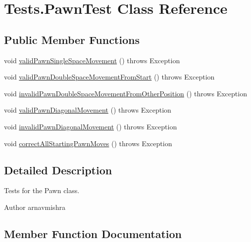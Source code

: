 \hypertarget{class_tests_1_1_pawn_test}{}\section{Tests.\+Pawn\+Test Class Reference}
\label{class_tests_1_1_pawn_test}
\subsection*{Public Member Functions}
\begin{DoxyCompactItemize}
\item 
void \hyperlink{class_tests_1_1_pawn_test_afc62c7df60ea48714139aa3b1fdec002}{valid\+Pawn\+Single\+Space\+Movement} ()  throws Exception 
\item 
void \hyperlink{class_tests_1_1_pawn_test_a609983048db9ea8be85c1a0eca1a4c64}{valid\+Pawn\+Double\+Space\+Movement\+From\+Start} ()  throws Exception 
\item 
void \hyperlink{class_tests_1_1_pawn_test_a62b592bc182e06d091c635fd46cf835b}{invalid\+Pawn\+Double\+Space\+Movement\+From\+Other\+Position} ()  throws Exception 
\item 
void \hyperlink{class_tests_1_1_pawn_test_aee76762875ad44ca3a078618467f4e87}{valid\+Pawn\+Diagonal\+Movement} ()  throws Exception 
\item 
void \hyperlink{class_tests_1_1_pawn_test_a5de98c4a33ad5690dda92cebdf5612a4}{invalid\+Pawn\+Diagonal\+Movement} ()  throws Exception 
\item 
void \hyperlink{class_tests_1_1_pawn_test_abddfebe793102a67725109bbe1a3ca31}{correct\+All\+Starting\+Pawn\+Moves} ()  throws Exception 
\end{DoxyCompactItemize}


\subsection{Detailed Description}
Tests for the Pawn class. \begin{DoxyAuthor}{Author}
arnavmishra 
\end{DoxyAuthor}


\subsection{Member Function Documentation}
\hypertarget{class_tests_1_1_pawn_test_abddfebe793102a67725109bbe1a3ca31}{}\label{class_tests_1_1_pawn_test_abddfebe793102a67725109bbe1a3ca31} 
